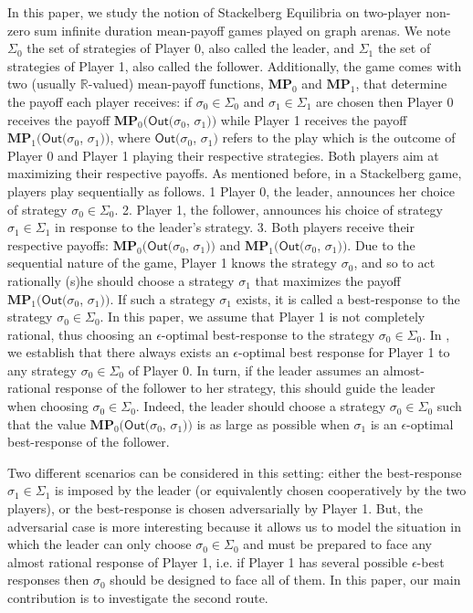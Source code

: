 In this paper, we study the notion of Stackelberg Equilibria on two-player non-zero sum infinite duration mean-payoff games played on graph arenas. We note $\Sigma_0$ the set of strategies of Player 0, also called the leader, and $\Sigma_1$ the set of strategies of Player 1, also called the follower. Additionally,
the game comes with two (usually $\mathbb{R}$-valued) mean-payoff functions, $\mathbf{MP}_0$ and $\mathbf{MP}_1$, that determine the payoff each player receives: if $\sigma_0 \in \Sigma_0$ and $\sigma_1 \in \Sigma_1$ are chosen then Player 0 receives the payoff $\mathbf{MP}_0 (\mathsf{Out}(\sigma_0$, $\sigma_1))$ while Player 1 receives the payoff $\mathbf{MP}_1(\mathsf{Out}(\sigma_0$, $\sigma_1))$, where $\mathsf{Out}(\sigma_0$, $\sigma_1)$ refers to the play which is the outcome of Player 0 and Player 1 playing their respective strategies. Both players aim at maximizing their respective payoffs. As mentioned before, in a Stackelberg game, players play sequentially as follows.
1 Player 0, the leader, announces her choice of strategy $\sigma_0 \in \Sigma_0$. 
2. Player 1, the follower, announces his choice of strategy $\sigma_1 \in \Sigma_1$ in response to the leader's strategy. 
3. Both players receive their respective payoffs: $\mathbf{MP}_0 (\mathsf{Out}(\sigma_0$, $\sigma_1))$ and $\mathbf{MP}_1 (\mathsf{Out}(\sigma_0$, $\sigma_1))$. 
Due to the sequential nature of the game, Player 1 knows the strategy $\sigma_0$, and so to act rationally (s)he should choose a strategy $\sigma_1$ that maximizes the payoff $\mathbf{MP}_1 (\mathsf{Out}(\sigma_0$, $\sigma_1))$. If such a strategy $\sigma_1$ exists, it is called a best-response to the strategy $\sigma_0 \in \Sigma_0$.
In this paper, we assume that Player 1 is not completely rational, thus choosing an $\epsilon$-optimal best-response to the strategy $\sigma_0 \in \Sigma_0$. In \cite{FGR20}, we establish that there always exists an $\epsilon$-optimal best response for Player 1 to any strategy $\sigma_0 \in \Sigma_0$ of Player 0.
In turn, if the leader assumes an almost-rational response of the follower to her strategy, this should guide the leader when choosing $\sigma_0 \in \Sigma_0$.
Indeed, the leader should choose a strategy $\sigma_0 \in \Sigma_0$ such that the value $\mathbf{MP}_0 (\mathsf{Out}(\sigma_0$, $\sigma_1))$ is as large as possible when $\sigma_1$ is an $\epsilon$-optimal best-response of the follower.

Two different scenarios can be considered in this setting: either the best-response $\sigma_1 \in \Sigma_1$ is imposed by the leader (or equivalently chosen cooperatively by the two players), or the best-response is chosen adversarially by Player 1. But, the adversarial case is more interesting because it allows us to model the situation in which the leader can only choose $\sigma_0 \in \Sigma_0$ and must be prepared to face any almost rational response of Player 1, i.e. if Player 1 has several possible $\epsilon$-best responses then $\sigma_0$ should be designed to face all of them. In this paper, our main contribution is to investigate the second route.


